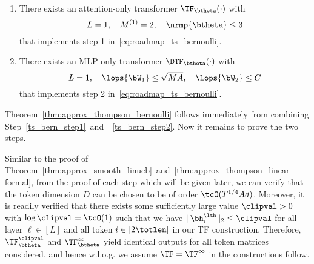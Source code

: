 \begin{enumerate}[label=Step \arabic*,ref= \arabic*]
    \item\label{ts_bern_step1} There exists an attention-only transformer $\TF_\btheta(\cdot)$ with     $$L=1,~~~M^{(1)}=2,~~~ \nrmp{\btheta}\leq 3 $$
 that implements step 1 in~\eqref{eq:roadmap_ts_bernoulli}.
   \item\label{ts_bern_step2} There exists an  MLP-only transformer $\DTF_\btheta(\cdot)$ with
    $$L=1,~~~\lops{\bW_1}\leq \sqrt{MA}, ~~~\lops{\bW_2}\leq C$$
 that implements step 2 in~\eqref{eq:roadmap_ts_bernoulli}.
\end{enumerate}
Theorem~\ref{thm:approx_thompson_bernoulli} follows immediately from combining Step~\ref{ts_bern_step1}~and~~\ref{ts_bern_step2}.  Now it remains to prove the two steps.


 Similar to the proof of Theorem~\ref{thm:approx_smooth_linucb}~and~\ref{thm:approx_thompson_linear-formal}, from the proof of each step which will be given later, we can verify that the token dimension $D$ can be chosen to be of order $\tcO(T^{1/4}Ad)$. Moreover,  it is readily verified that there exists some sufficiently large value $\clipval>0$ with $\log \clipval=\tcO(1)$ such that  we have $\| \bh_i^{\lth} \|_{2} \leq\clipval$
 for all layer $\ell\in[L]$ and all token $i\in[2\totlen]$ in our TF construction. Therefore, $\TF^\clipval_\btheta$ and $\TF^\infty_\btheta$ yield identical outputs for all token matrices considered, and hence w.l.o.g. we assume $\TF=\TF^\infty$ in the constructions follow.









